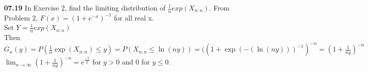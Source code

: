 
{ \bf 07.19 }
In Exercise 2, find the limiting distribution of $\frac{1}{n} exp (X_{n:n})$.  From Problem 2,  $F(x) = (1+ e^{-x})^{-1}$ for all real x.\\
Set $Y = \frac{1}{n} exp(X_{n:n})$\\
Then $G_{n}(y) = P(\frac{1}{n} \exp(X_{n:n}) \le y) = P(X_{n:n} \le \ln(ny)) = ((1+\exp(-(\ln(ny)))^{-1})^{-n} = (1 + \frac{1}{ny})^{-n}$\\
$\lim_{n\to\infty} (1+\frac{1}{ny})^{-n} =   e^{\frac{-1}{y}}$ for $y > 0 $ and $0$ for $y\le 0$.

